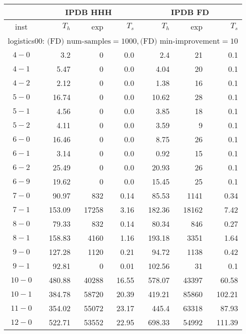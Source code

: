 \begin{longtable}{|c||r|r|r||r|r|r|}\firsthline
& \multicolumn{3}{c||}{IPDB HHH} & \multicolumn{3}{c||}{IPDB FD}\\\hline
inst & $T_h$ & exp & $T_s$ & $T_h$ & exp & $T_s$\\\hline
\multicolumn{7}{|l|}{logistics00: $\text{(FD) num-samples}=1000,\text{(FD) min-improvement}=10$}\\\hline
$4-0$ & 3.2 & 0 & 0.0 & 2.4 & 21 & 0.1 \\\hline
$4-1$ & 5.47 & 0 & 0.0 & 4.04 & 20 & 0.1 \\\hline
$4-2$ & 2.12 & 0 & 0.0 & 1.38 & 16 & 0.1 \\\hline
$5-0$ & 16.74 & 0 & 0.0 & 10.62 & 28 & 0.1 \\\hline
$5-1$ & 4.56 & 0 & 0.0 & 3.85 & 18 & 0.1 \\\hline
$5-2$ & 4.11 & 0 & 0.0 & 3.59 & 9 & 0.1 \\\hline
$6-0$ & 16.46 & 0 & 0.0 & 8.75 & 26 & 0.1 \\\hline
$6-1$ & 3.14 & 0 & 0.0 & 0.92 & 15 & 0.1 \\\hline
$6-2$ & 25.49 & 0 & 0.0 & 20.93 & 26 & 0.1 \\\hline
$6-9$ & 19.62 & 0 & 0.0 & 15.45 & 25 & 0.1 \\\hline
$7-0$ & 90.97 & 832 & 0.14 & 85.53 & 1141 & 0.34 \\\hline
$7-1$ & 153.09 & 17258 & 3.16 & 182.36 & 18162 & 7.42 \\\hline
$8-0$ & 79.33 & 832 & 0.14 & 80.34 & 846 & 0.27 \\\hline
$8-1$ & 158.83 & 4160 & 1.16 & 193.18 & 3351 & 1.64 \\\hline
$9-0$ & 127.28 & 1120 & 0.21 & 94.72 & 1138 & 0.42 \\\hline
$9-1$ & 92.81 & 0 & 0.01 & 102.56 & 31 & 0.1 \\\hline
$10-0$ & 480.88 & 40288 & 16.55 & 578.07 & 43397 & 60.58 \\\hline
$10-1$ & 384.78 & 58720 & 20.39 & 419.21 & 85860 & 102.21 \\\hline
$11-0$ & 354.02 & 55072 & 23.17 & 445.4 & 63318 & 87.93 \\\hline
$12-0$ & 522.71 & 53552 & 22.95 & 698.33 & 54992 & 111.39 \\\hline


\end{longtable}
